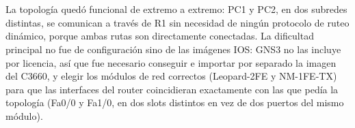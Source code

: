 \documentclass[10pt,a4paper]{article}
\begin{document}
\section{\color{colorIPN}{Conclusiones}}

La topología quedó funcional de extremo a extremo: PC1 y PC2, en dos subredes distintas, se comunican a través de R1 sin necesidad de ningún protocolo de ruteo dinámico, porque ambas rutas son directamente conectadas. La dificultad principal no fue de configuración sino de las imágenes IOS: GNS3 no las incluye por licencia, así que fue necesario conseguir e importar por separado la imagen del C3660, y elegir los módulos de red correctos (Leopard-2FE y NM-1FE-TX) para que las interfaces del router coincidieran exactamente con las que pedía la topología (Fa0/0 y Fa1/0, en dos slots distintos en vez de dos puertos del mismo módulo).
\end{document}
